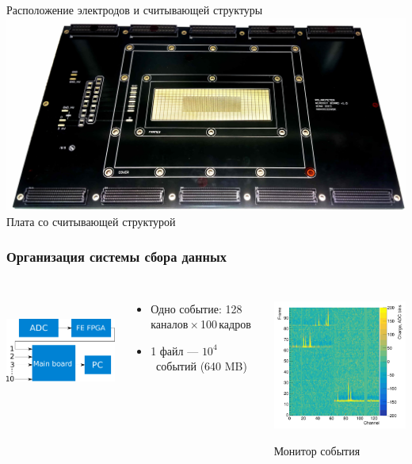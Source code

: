 \documentclass[14pt]{beamer}
\begin{document}
\begin{frame}[t]
\begin{minipage}[t]{0.39\linewidth}
		\tiny{Расположение электродов и считывающей структуры}
		\includegraphics[width=1\linewidth]{Main_board.jpg} 
		\newline \centering\tiny{Плата со считывающей структурой}
		\end{minipage}	
\end{frame}
\begin{frame}[t]

\frametitle{Организация системы сбора данных }
\begin{columns}
	\begin{minipage}[t][1\textheight]{\linewidth}
		\centering \includegraphics[width=6.6cm, height = 4cm]{DAQ.pdf}
		\small{\begin{itemize}
				\item Одно событие: 128\,каналов\,$\times$\,100\,кадров 
				\item 1 файл --- $10^4$~событий (640 MB)
		\end{itemize}}
	\end{minipage}%
	\begin{minipage}[t][1\textheight]{\linewidth}
		\vspace{20pt}
		\centering \includegraphics[width=5cm, height = 5cm]{Signal.png}
		\centering \tiny{Монитор события}
		
	\end{minipage}%
\end{columns}\end{frame}
\end{document}
